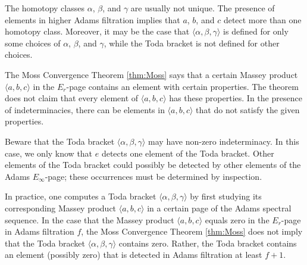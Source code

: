 \begin{remark}
The homotopy classes $\alpha$, $\beta$, and $\gamma$ 
are usually not unique.  The presence of elements in higher 
Adams filtration implies that $a$, $b$, and $c$ detect more
than one homotopy class.  Moreover, it may be the case that 
$\langle \alpha, \beta, \gamma \rangle$ is defined for only
some choices of $\alpha$, $\beta$, and $\gamma$, 
while the Toda bracket is not defined for other choices.
\end{remark}

\begin{remark}
The Moss Convergence Theorem \ref{thm:Moss} says that
a certain Massey product $\langle a, b, c \rangle$ in the $E_r$-page
contains an element with certain properties.
The theorem does not claim that every element of
$\langle a, b, c \rangle$ has these properties.  In the presence
of indeterminacies, there can be elements in $\langle a, b, c\rangle$
that do not satisfy the given properties.
\end{remark}

\begin{remark}
Beware that the Toda bracket $\langle \alpha, \beta, \gamma \rangle$
may have non-zero indeterminacy.  In this case,
we only know that $e$ detects one element of the Toda bracket.
Other elements of the Toda bracket could possibly be detected by
other elements of the Adams $E_\infty$-page; these occurrences must
be determined by inspection.
\end{remark}

\begin{remark}
In practice, one computes a Toda bracket
$\langle \alpha, \beta, \gamma \rangle$ by first studying
its corresponding Massey product $\langle a, b, c \rangle$ 
in a certain page of the Adams spectral sequence. 
In the case that the Massey product
$\langle a, b, c \rangle$ equals zero in the $E_r$-page
in Adams filtration $f$, 
the Moss Convergence Theorem \ref{thm:Moss}
does not imply that the Toda bracket 
$\langle \alpha, \beta, \gamma \rangle$ contains zero.  Rather,
the Toda bracket contains an element (possibly zero) that is detected
in Adams filtration at least $f+1$.
\end{remark}

